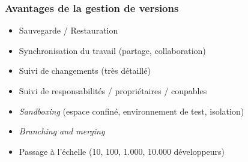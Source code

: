\documentclass[table,tikz,12pt,svgnames]{beamer}
\begin{document}
%

\begin{frame}
	\frametitle{Avantages de la gestion de versions}
	\begin{block}{}
    \begin{adjustwidth}{-0.3cm}{-1.4cm}{}
		\begin{itemize}
			\item Sauvegarde / Restauration
			\item Synchronisation du travail (partage, collaboration)
			\item Suivi de changements (très détaillé)
			\item Suivi de responsabilités / propriétaires / coupables
			\item \textit{Sandboxing} (espace confiné, environnement de test, isolation)
			\item \textit{Branching and merging}
			\item Passage à l'échelle (10, 100, 1.000, 10.000 développeurs)
		\end{itemize}
	\end{adjustwidth}
	\end{block}
\end{frame}
\end{document}
